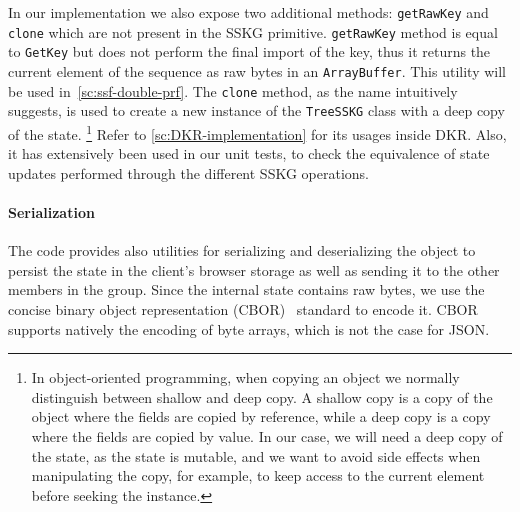 In our implementation we also expose two additional methods:
\texttt{getRawKey} and \texttt{clone} which are not present 
in the SSKG primitive. 
\texttt{getRawKey} method is equal to \texttt{GetKey}
but does not perform the final import of the key, thus it 
returns the current element of the sequence as raw bytes
in an \texttt{ArrayBuffer}. 
This utility will be used in~\cref{sc:ssf-double-prf}.
The \texttt{clone} method, as the name intuitively suggests, 
is used to create a new instance
of the \texttt{TreeSSKG} class with a deep copy of the state.
\footnote{In object-oriented programming, when copying an object we normally distinguish between shallow and deep copy. 
A shallow copy is a copy of the object where the fields are 
copied by reference, while a deep copy is a copy where the 
fields are copied by value. 
In our case, we will need a deep copy of the state, 
as the state is mutable, and we want to avoid side effects 
when manipulating the copy, for example, to keep access to the current element before seeking the instance.} 
Refer to \cref{sc:DKR-implementation} for its usages inside DKR. 
Also, it has extensively been used in our unit tests, to check the equivalence
of state updates performed through the different SSKG operations.

\paragraph{Serialization} The code provides also utilities for serializing and deserializing 
the object to persist the state in the client's browser storage
as well as sending it to the other members in the group.
Since the internal state contains raw bytes, we use the concise binary 
object representation (CBOR)~\cite{rfc8949} standard to encode it. 
CBOR supports natively the encoding of byte arrays, which is not the case
for JSON.

